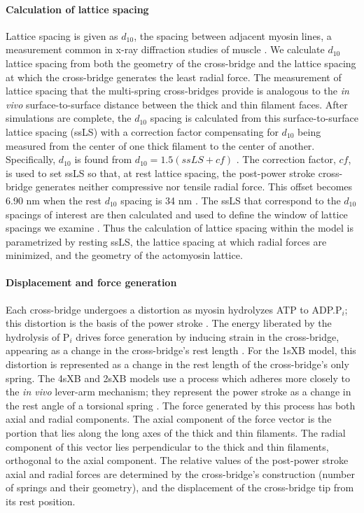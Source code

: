 \documentclass[11pt,titlepage]{article}
\begin{document}
\paragraph{Calculation of lattice spacing} %
Lattice spacing is given as $d_{10}$, the spacing between adjacent myosin lines, a measurement common in x-ray diffraction studies of muscle \citep{Millman1998}.
We calculate $d_{10}$ lattice spacing from both the geometry of the cross-bridge and the lattice spacing at which the cross-bridge generates the least radial force. 
The measurement of lattice spacing that the multi-spring cross-bridges provide is analogous to the \emph{in vivo} surface-to-surface distance between the thick and thin filament faces.
After simulations are complete, the $d_{10}$ spacing is calculated from this surface-to-surface lattice spacing (ssLS) with a correction factor compensating for $d_{10}$ being measured from the center of one thick filament to the center of another. 
Specifically, $d_{10}$ is found from $d_{10} = 1.5 (ssLS + cf)$ \citep{Millman1998}. 
The correction factor, $cf$, is used to set ssLS so that, at rest lattice spacing, the post-power stroke cross-bridge generates neither compressive nor tensile radial force.  
This offset becomes 6.90 nm when the rest $d_{10}$ spacing is 34 nm \citep{Brenner1991}. 
The ssLS that correspond to the $d_{10}$ spacings of interest are then calculated and used to define the window of lattice spacings we examine \citep{Millman1998}. 
Thus the calculation of lattice spacing within the model is parametrized by resting ssLS, the lattice spacing at which radial forces are minimized, and the geometry of the actomyosin lattice. 

\paragraph{Displacement and force generation} %
Each cross-bridge undergoes a distortion as myosin hydrolyzes ATP to ADP.P$_i$; this distortion is the basis of the power stroke \citep{Pate1989, Daniel1998, Tanner2007}. 
The energy liberated by the hydrolysis of P$_i$ drives force generation by inducing strain in the cross-bridge, appearing as a change in the cross-bridge's rest length \citep{HowardBook}.  
For the 1sXB model, this distortion is represented as a change in the rest length of the cross-bridge's only spring. 
The 4sXB and 2sXB models use a process which adheres more closely to the \emph{in vivo} lever-arm mechanism; they represent the power stroke as a change in the rest angle of a torsional spring \citep{Reedy2000}.
The force generated by this process has both axial and radial components. 
The axial component of the force vector is the portion that lies along the long axes of the thick and thin filaments. 
The radial component of this vector lies perpendicular to the thick and thin filaments, orthogonal to the axial component. 
The relative values of the post-power stroke axial and radial forces are determined by the cross-bridge's construction (number of springs and their geometry), and the displacement of the cross-bridge tip from its rest position. 
\end{document}
